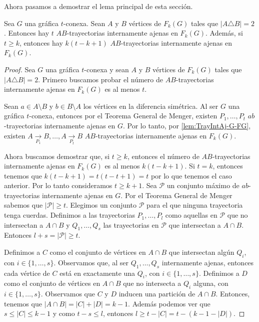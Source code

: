 Ahora pasamos a demostrar el lema principal de esta secci\'on.

\begin{lema}%
\label{lem:TrayIntAj}
    Sea $G$ una gr\'afica $t$-conexa. Sean $A$ y $B$ v\'ertices de $F_{k}(G)$
    tales que $|A \triangle B| = 2$. Entonces hay $t$ $AB$-trayectorias
    internamente ajenas en $F_{k}(G)$. Adem\'as, si $t \geq k$, entonces hay
    $k(t- k + 1)$ $AB$-trayectorias internamente ajenas en $F_{k}(G)$.
\end{lema}

\begin{proof}
    Sea $G$ una gr\'afica $t$-conexa y sean $A$ y $B$ v\'ertices de $F_{k}(G)$
    tales que $|A \triangle B| = 2$. Primero buscamos probar el n\'umero de
    $AB$-trayectorias internamente ajenas en $F_{k}(G)$ es al menos $t$. 
    
    Sean $a \in A \setminus B$ y $b \in B \setminus A$ los v\'ertices en la
    diferencia sim\'etrica. Al ser $G$ una gr\'afica $t$-conexa, entonces por el
    Teorema General de Menger, existen $P_{1}, \dots, P_{t}$ $ab$-trayectorias
    internamente ajenas en $G$. Por lo tanto, por \cref{lem:TrayIntAj-G-FG},
    existen $A \xrightarrow[P_1]{}  B, \dots, A \xrightarrow[P_t]{}  B$
    $AB$-trayectorias internamente ajenas en $F_{k}(G)$. 

    Ahora buscamos demostrar que, si $t \geq k$, entonces el n\'umero de
    $AB$-trayectorias internamente ajenas en $F_{k}(G)$ es al menos $k(t- k
    +1)$. Si $t=k$, entonces tenemos que $k(t - k + 1) = t(t-t+1) = t$ por lo
    que tenemos el caso anterior. Por lo tanto consideramos  $t \geq k + 1$. Sea
    $\mathcal{P}$ un conjunto m\'aximo de $ab$-trayectorias internamente ajenas
    en $G$. Por el Teorema General de Menger sabemos que $|\mathcal{P}| \ge t$.
    Elegimos un conjunto $\mathcal{P}$ para el que ninguna trayectoria tenga
    cuerdas. Definimos a las trayectorias $P_{1}, \dots, P_{l}$ como aquellas en
    $\mathcal{P}$ que no intersectan a $A \cap B$ y $Q_{1}, \dots, Q_{s}$ las
    trayectorias en $\mathcal{P}$ que intersectan a $A \cap B$. Entonces $l + s
    = |\mathcal{P}| \ge t$.

    Definimos a $C$ como el conjunto de v\'ertices en $A \cap B$ que intersectan
    alg\'un $Q_i$, con $i \in \{1, \dots, s\}$. Observamos que, al ser $Q_1,
    \dots, Q_s$ internamente ajenas, entonces cada v\'ertice de $C$ est\'a en
    exactamente una $Q_i$, con $i \in \{1, \dots, s\}$. Definimos a $D$ como el
    conjunto de v\'ertices en $A \cap B$ que no intersecta a $Q_i$ alguna, con
    $i \in \{1, \dots, s\}$. Observamos que $C$ y $D$ inducen una partici\'on
    de $A \cap B$. Entonces, tenemos que $|A\cap B| = |C| + |D| = k-1$. Adem\'as
    podemos ver que $s \leq |C| \leq k-1$ y como $ t - s \leq l$, entonces $l
    \geq t -|C| = t- (k-1-|D|)$.


\end{proof}
